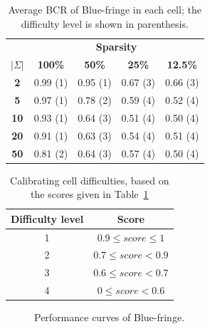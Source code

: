 \begin{table}
\begin{center}
\begin{tabular}{c|c c c c}
&\multicolumn{4}{|c}{\textbf{Sparsity}}\\ 
\textbf{$|\Sigma|$} & \textbf{100\%} & \textbf{50\%} & \textbf{25\%} & \textbf{12.5\%}\\
\hline
\textbf{2}  & 0.99 (1) & 0.95 (1) & 0.67 (3) & 0.66 (3)\\
\textbf{5}  & 0.97 (1) & 0.78 (2) & 0.59 (4) & 0.52 (4)\\
\textbf{10} & 0.93 (1) & 0.64 (3) & 0.51 (4) & 0.50 (4)\\
\textbf{20} & 0.91 (1) & 0.63 (3) & 0.54 (4) & 0.51 (4)\\
\textbf{50} & 0.81 (2) & 0.64 (3) & 0.57 (4) & 0.50 (4)\\
\end{tabular}
\end{center}
\caption[Average BCR of Blue-fringe in each cell]{Average BCR of Blue-fringe in each cell; the difficulty level is shown in parenthesis.\label{table:stamina-baseline}}
\end{table}

\begin{table}
\begin{center}
\begin{tabular}{c|c}
Difficulty level & Score\\
\hline
1&$0.9 \leq score \leq 1$\\
2&$0.7 \leq score < 0.9$\\
3&$0.6 \leq score < 0.7$\\
4&$0 \leq score < 0.6$\\
\end{tabular}
\end{center}
\caption[Calibrating cell difficulties]{\label{stamina:table:calibration}Calibrating cell difficulties, based on the scores given in Table~\ref{table:stamina-baseline}}
\end{table}

\begin{figure}
\centering{}
  \caption{Performance curves of Blue-fringe\label{stamina:image:bluefringe-performance}.}
\end{figure}


